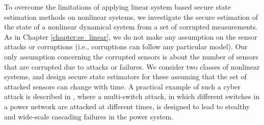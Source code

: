 %
%
%
To overcome the limitations of applying linear system based secure state estimation methods on nonlinear systems, we investigate the secure estimation of the state of a nonlinear dynamical system from a set of corrupted measurements. 
As in Chapter \ref{chapter:se_linear}, we do not make any assumption on the sensor attacks or corruptions (i.e., corruptions can follow any particular model). Our only assumption concerning the corrupted sensors is about the number of sensors that are corrupted due to attacks or failures. We consider two classes of nonlinear systems, and design secure state estimators for these assuming that the set of attacked sensors can change with time. A practical example of such a cyber attack is described in \cite{liu2014coordinated}, where a multi-switch attack, in which different switches in a power network are attacked at different times, is designed to lead to stealthy and wide-scale cascading failures in the power system.
